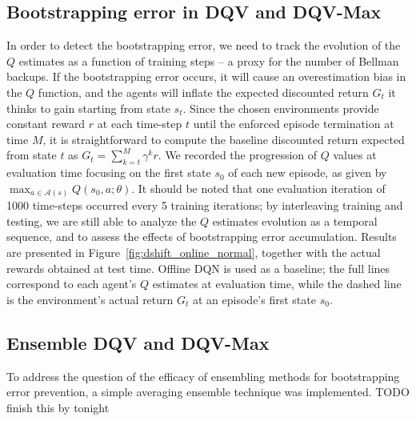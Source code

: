 \subsection{Bootstrapping error in DQV and DQV-Max}
In order to detect the bootstrapping error, we need to track the
evolution of the $Q$ estimates as a function of training steps -- a
proxy for the number of Bellman backups. If the
bootstrapping error occurs, it will cause an overestimation bias in
the $Q$ function, and the agents will inflate the expected discounted
return $G_t$ it thinks to gain starting from state $s_t$. Since the
chosen environments provide constant reward $r$ at each time-step $t$
until the enforced episode termination at time $M$, it is
straightforward to compute the baseline discounted return expected
from state $t$ as $G_t=\sum^{M}_{k=t}\gamma^{k}r$.
We recorded the progression of $Q$ values at evaluation time focusing
on the first state $s_0$ of each new episode, as given by $\max_{a\in
  \mathcal{A}\left(s\right)}Q\left(s_0,a;\theta\right)$. It should be
noted that one evaluation iteration of 1000 time-steps occurred every
5 training iterations; by interleaving training and testing, we are
still able to analyze the $Q$ estimates evolution as a temporal
sequence, and to assess the effects of bootstrapping error
accumulation. Results are presented in
Figure~\ref{fig:dshift_online_normal}, together with the actual
rewards obtained at test time. Offline DQN is used as a baseline; the
full lines correspond to each agent's $Q$ estimates at evaluation
time, while the dashed line is the environment's actual return $G_t$
at an episode's first state $s_0$.

\subsection{Ensemble DQV and DQV-Max}
To address the question of the efficacy of ensembling methods for
bootstrapping error prevention, a simple averaging ensemble technique
was implemented. TODO finish this by tonight
